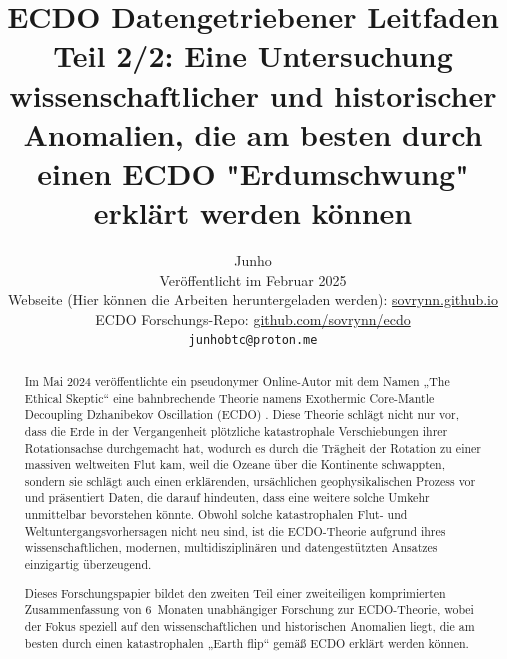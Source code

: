 \documentclass[10pt,twocolumn,letterpaper]{article}
\begin{document}
\title{ECDO Datengetriebener Leitfaden Teil 2/2: Eine Untersuchung wissenschaftlicher und historischer Anomalien, die am besten durch einen ECDO "Erdumschwung" erklärt werden können}

\author{Junho\\
Veröffentlicht im Februar 2025\\
Webseite (Hier können die Arbeiten heruntergeladen werden): \href{https://sovrynn.github.io}{sovrynn.github.io}\\
ECDO Forschungs-Repo: \href{https://github.com/sovrynn/ecdo}{github.com/sovrynn/ecdo}\\
{\tt\small junhobtc@proton.me}
}

\maketitle

\begin{abstract}
Im Mai 2024 veröffentlichte ein pseudonymer Online-Autor mit dem Namen „The Ethical Skeptic“ \cite{0} eine bahnbrechende Theorie namens Exothermic Core-Mantle Decoupling Dzhanibekov Oscillation (ECDO) \cite{1}. Diese Theorie schlägt nicht nur vor, dass die Erde in der Vergangenheit plötzliche katastrophale Verschiebungen ihrer Rotationsachse durchgemacht hat, wodurch es durch die Trägheit der Rotation zu einer massiven weltweiten Flut kam, weil die Ozeane über die Kontinente schwappten, sondern sie schlägt auch einen erklärenden, ursächlichen geophysikalischen Prozess vor und präsentiert Daten, die darauf hindeuten, dass eine weitere solche Umkehr unmittelbar bevorstehen könnte. Obwohl solche katastrophalen Flut- und Weltuntergangsvorhersagen nicht neu sind, ist die ECDO-Theorie aufgrund ihres wissenschaftlichen, modernen, multidisziplinären und datengestützten Ansatzes einzigartig überzeugend.

Dieses Forschungspapier bildet den zweiten Teil einer zweiteiligen komprimierten Zusammenfassung von 6 Monaten unabhängiger Forschung \cite{2,20} zur ECDO-Theorie, wobei der Fokus speziell auf den wissenschaftlichen und historischen Anomalien liegt, die am besten durch einen katastrophalen „Earth flip“ gemäß ECDO erklärt werden können.
\end{abstract}
\end{document}
